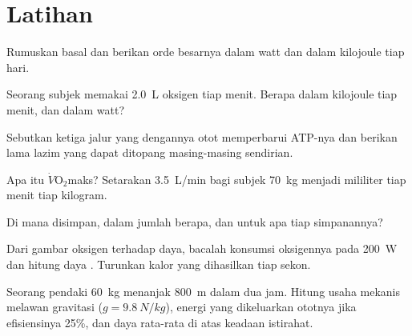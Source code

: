 \section{Latihan}

\begin{exercise}[$\star$]\label{exo:g10:exercise-and-energy:1}
Rumuskan  basal dan berikan orde besarnya dalam watt dan
dalam kilojoule tiap hari.
\end{exercise}

\begin{exercise}[$\star$]\label{exo:g10:exercise-and-energy:2}
Seorang subjek memakai \qty{2.0}{L} oksigen tiap menit. Berapa
 dalam kilojoule tiap menit, dan dalam watt?
\end{exercise}

\begin{exercise}[$\star$]\label{exo:g10:exercise-and-energy:3}
Sebutkan ketiga jalur yang dengannya otot memperbarui ATP-nya dan
berikan lama lazim yang dapat ditopang masing-masing sendirian.
\end{exercise}

\begin{exercise}[$\star$]\label{exo:g10:exercise-and-energy:4}
Apa itu $\dot V\!\mathrm{O_2}$maks? Setarakan \qty{3.5}{L/min} bagi
subjek \qty{70}{kg} menjadi mililiter tiap menit tiap kilogram.
\end{exercise}

\begin{exercise}[$\star$]\label{exo:g10:exercise-and-energy:5}
Di mana  disimpan, dalam jumlah berapa, dan untuk apa tiap simpanannya?
\end{exercise}

\begin{exercise}[$\star\star$]\label{exo:g10:exercise-and-energy:6}
Dari gambar oksigen terhadap daya, bacalah konsumsi oksigennya pada
\qty{200}{W} dan hitung daya . Turunkan kalor yang
dihasilkan tiap sekon.
\end{exercise}

\begin{exercise}[$\star\star$]\label{exo:g10:exercise-and-energy:7}
Seorang pendaki \qty{60}{kg} menanjak \qty{800}{m} dalam dua jam.
Hitung usaha mekanis melawan gravitasi ($g = \qty{9.8}{N/kg}$), energi
yang dikeluarkan ototnya jika efisiensinya 25\%, dan daya 
rata-rata di atas keadaan istirahat.
\end{exercise}

